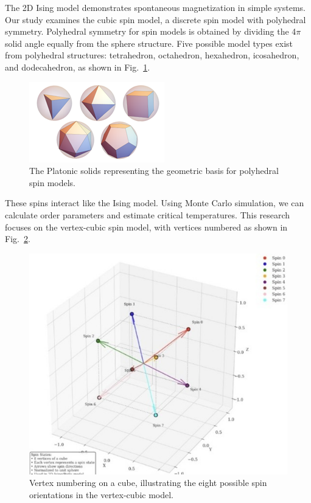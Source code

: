\documentclass[conference, compsoc, twoside]{IEEEtran}
\begin{document}
The 2D Ising model demonstrates spontaneous magnetization in simple systems. Our study examines the cubic spin model, a discrete spin model with polyhedral symmetry. Polyhedral symmetry for spin models is obtained by dividing the 4$\pi$ solid angle equally from the sphere structure. Five possible model types exist from polyhedral structures: tetrahedron, octahedron, hexahedron, icosahedron, and dodecahedron, as shown in Fig.~\ref{fig:platonic_solids}.

\begin{figure}[t]
    \centering
    \includegraphics[width=0.9\columnwidth]{Gambar 6. The Platonic Solids.png}
    \caption{The Platonic solids representing the geometric basis for polyhedral spin models.}
    \label{fig:platonic_solids}
\end{figure}

These spins interact like the Ising model. Using Monte Carlo simulation, we can calculate order parameters and estimate critical temperatures. This research focuses on the vertex-cubic spin model, with vertices numbered as shown in Fig.~\ref{fig:cube_vertices}.

\begin{figure}[t]
    \centering
    \includegraphics[width=0.9\columnwidth]{Gambar 7. Penommoran Titik Sudut pada Kubus.jpg}
    \caption{Vertex numbering on a cube, illustrating the eight possible spin orientations in the vertex-cubic model.}
    \label{fig:cube_vertices}
\end{figure}
\end{document}
